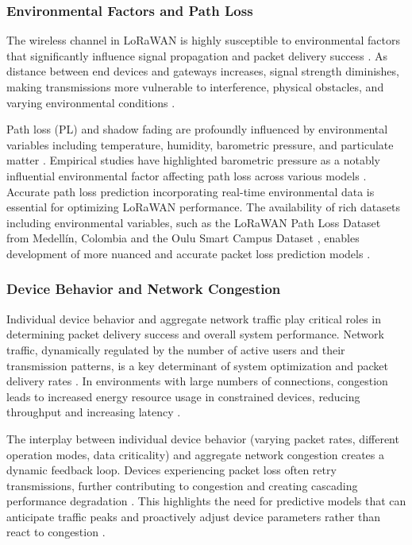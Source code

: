 \documentclass[12pt,a4paper]{article}
\begin{document}
\subsubsection{Environmental Factors and Path Loss}

The wireless channel in LoRaWAN is highly susceptible to environmental factors that significantly influence signal propagation and packet delivery success \cite{Raza17}. As distance between end devices and gateways increases, signal strength diminishes, making transmissions more vulnerable to interference, physical obstacles, and varying environmental conditions \cite{Guo21, Bor16}.

Path loss (PL) and shadow fading are profoundly influenced by environmental variables including temperature, humidity, barometric pressure, and particulate matter \cite{rademacher2021pathlossurbanlora, Mokua2025A_Comprehensive_data}. Empirical studies have highlighted barometric pressure as a notably influential environmental factor affecting path loss across various models \cite{Mokua2025A_Comprehensive_data, Aarif2025rssi_prediction}. Accurate path loss prediction incorporating real-time environmental data is essential for optimizing LoRaWAN performance. The availability of rich datasets including environmental variables, such as the LoRaWAN Path Loss Dataset from Medellín, Colombia \cite{alkhayyal2025enhancing_lorawan_sensor_networks} and the Oulu Smart Campus Dataset \cite{Eldeeb-lorawan}, enables development of more nuanced and accurate packet loss prediction models \cite{GonzalezPalacio2024_ML_TransmissionPowerControl}.

\subsubsection{Device Behavior and Network Congestion}

Individual device behavior and aggregate network traffic play critical roles in determining packet delivery success and overall system performance. Network traffic, dynamically regulated by the number of active users and their transmission patterns, is a key determinant of system optimization and packet delivery rates \cite{Tabatowski-Bush2024LoRaWANWarehouse}. In environments with large numbers of connections, congestion leads to increased energy resource usage in constrained devices, reducing throughput and increasing latency \cite{rahman2023enhancing}.

The interplay between individual device behavior (varying packet rates, different operation modes, data criticality) and aggregate network congestion creates a dynamic feedback loop. Devices experiencing packet loss often retry transmissions, further contributing to congestion and creating cascading performance degradation \cite{Imo2025}. This highlights the need for predictive models that can anticipate traffic peaks and proactively adjust device parameters rather than react to congestion \cite{Tabatowski-Bush2024LoRaWANWarehouse}.
\end{document}
